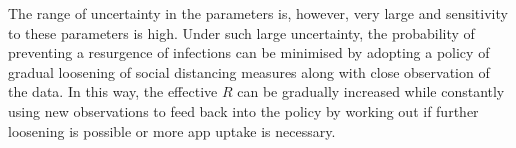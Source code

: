 \documentclass{article}
\begin{document}
The range of uncertainty in the parameters is, however, very large and sensitivity to these parameters is high. Under such large uncertainty, the probability of preventing a resurgence of infections can be minimised by adopting a policy of gradual loosening of social distancing measures along with close observation of the data. In this way, the effective $R$ can be gradually increased while constantly using new observations to feed back into the policy by working out if further loosening is possible or more app uptake is necessary.

%
% 


\end{document}
